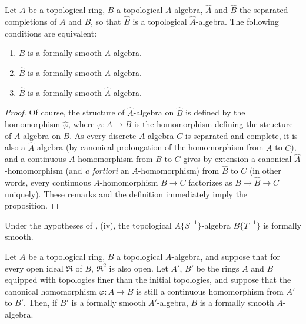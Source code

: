 \begin{proposition}[19.3.6]
\label{0.19.3.6}
Let $A$ be a topological ring, $B$ a topological $A$-algebra, $\widehat{A}$ and $\widehat{B}$ the separated completions of $A$ and $B$, so that $\widehat{B}$ is a topological $\widehat{A}$-algebra.
The following conditions are equivalent:
\begin{enumerate}
  \item[a)] $B$ is a formally smooth $A$-algebra.
  \item[b)] $\widehat{B}$ is a formally smooth $A$-algebra.
  \item[c)] $\widehat{B}$ is a formally smooth $\widehat{A}$-algebra.
\end{enumerate}
\end{proposition}

\begin{proof}
Of course, the structure of $\widehat{A}$-algebra on $\widehat{B}$ is defined by the homomorphism $\hat{\varphi}$, where $\varphi:A\to B$ is the homomorphism defining the structure of $A$-algebra on $B$.
As every discrete $A$-algebra $C$ is separated and complete, it is also a $\widehat{A}$-algebra (by canonical prolongation of the homomorphism from $A$ to $C$), and a continuous $A$-homomorphism from $B$ to $C$ gives by extension a canonical $\widehat{A}$-homomorphism (and \emph{a fortiori} an $A$-homomorphism) from $\widehat{B}$ to $C$ (in other words, every continuous $A$-homomorphism $B\to C$ factorizes as $B\to\widehat{B}\to C$ uniquely).
These remarks and the definition  immediately imply the proposition.
\end{proof}

\begin{corollary}[19.3.7]
\label{0.19.3.7}
Under the hypotheses of , (iv), the topological $A\{S^{-1}\}$-algebra $B\{T^{-1}\}$ is formally smooth.
\end{corollary}

\begin{proposition}[19.3.8]
\label{0.19.3.8}
Let $A$ be a topological ring, $B$ a topological $A$-algebra, and suppose that for every open ideal $\mathfrak{R}$ of $B$, $\mathfrak{R}^2$ is also open.
Let $A'$, $B'$ be the rings $A$ and $B$ equipped with topologies finer than the initial topologies, and suppose that the canonical homomorphism $\varphi:A\to B$ is still a continuous homomorphism from $A'$ to $B'$.
Then, if $B'$ is a formally smooth $A'$-algebra, $B$ is a formally smooth $A$-algebra.
\end{proposition}

